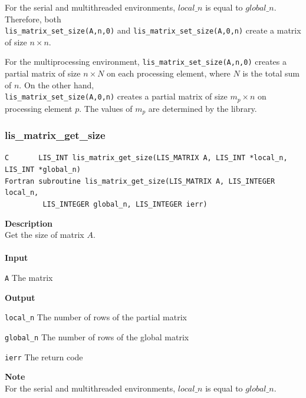 \documentclass[a4paper]{article}
\newcommand{\namelistlabel}[1]{\mbox{#1}\hfill}
\newenvironment{namelist}[1]{%
\begin{list}{}
  {\let\makelabel\namelistlabel
  \settowidth{\labelwidth}{#1}
  \setlength{\leftmargin}{1.1\labelwidth}}
  }{%
\end{list}}
\begin{document}
For the serial and multithreaded environments, $local\_n$ is
equal to $global\_n$. 
Therefore, both \\
\verb|lis_matrix_set_size(A,n,0)| and \verb|lis_matrix_set_size(A,0,n)|
create a matrix of size $n \times n$.

For the multiprocessing environment, \verb|lis_matrix_set_size(A,n,0)| creates
a partial matrix of size $n \times N$ on each processing element, 
where $N$ is the total sum of $n$. 
On the other hand, \\
\verb|lis_matrix_set_size(A,0,n)| creates 
a partial matrix of size $m_p \times n$ on processing element $p$.
The values of $m_p$ are determined by the library.

\subsubsection{lis\_matrix\_get\_size}
\begin{screen}
\verb|C       LIS_INT lis_matrix_get_size(LIS_MATRIX A, LIS_INT *local_n,|
\verb|         LIS_INT *global_n)|\\
\verb|Fortran subroutine lis_matrix_get_size(LIS_MATRIX A, LIS_INTEGER local_n,|\\
\verb|         LIS_INTEGER global_n, LIS_INTEGER ierr)|
\end{screen}
{\bf Description}\\
\indent
Get the size of matrix $A$.
\\ \\
\noindent
{\bf Input}
\begin{namelist}{XXXXXXXXXXXXXXXXXXXX}
\item[\tt A] The matrix
\end{namelist}
{\bf Output}
\begin{namelist}{XXXXXXXXXXXXXXXXXXXX}
\item[\tt local\_n] The number of rows of the partial matrix
\item[\tt global\_n] The number of rows of the global matrix
\item[\tt ierr] The return code
\end{namelist}
{\bf Note}\\
\indent
For the serial and multithreaded environments, $local\_n$ is
equal to $global\_n$. 
\end{document}
